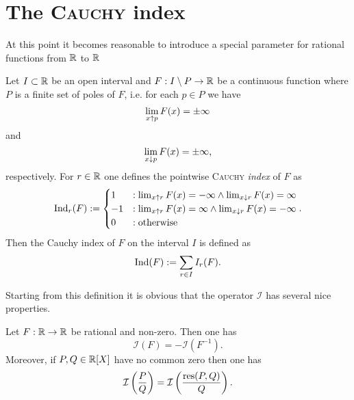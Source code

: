 \section{The \textsc{Cauchy} index}

At this point it becomes reasonable to introduce a special parameter for rational functions from $\mathbb{R}$ to $\mathbb{R}$

\begin{definition} Let $I\subset\mathbb{R}$ be an open interval and $F:I\setminus P\rightarrow \mathbb{R}$ be a continuous function where $P$ is a finite set of poles of $F$, i.e. for each $p\in P$ we have 
\begin{equation}
\lim_{x\uparrow p}{F(x)}=\pm\infty
\end{equation}
and 
\begin{equation}
\lim_{x\downarrow p}{F(x)}=\pm\infty\text{,}
\end{equation}
respectively. For $r\in\mathbb{R}$ one defines the pointwise \textsc{Cauchy} \emph{index} of $F$ as
\begin{equation}
\operatorname{Ind}_r(F):=\begin{cases}
1 &: \lim_{x\uparrow r}{F(x)}=-\infty\wedge \lim_{x\downarrow r}{F(x)}=\infty\\
-1 &: \lim_{x\uparrow r}{F(x)}=\infty\wedge \lim_{x\downarrow r}{F(x)}=-\infty\\
0 &: \text{otherwise}
\end{cases}\text{.}
\end{equation}
Then the Cauchy index of $F$ on the interval $I$ is defined as
\begin{equation}
\operatorname{Ind}(F) := \sum_{r\in I}{I_r(F)}\text{.}
\end{equation}
\end{definition}

Starting from this definition it is obvious that the operator $\mathcal{I}$ has several nice properties.

\begin{lemma}
Let $F:\mathbb{R}\rightarrow\mathbb{R}$ be rational and non-zero. Then one has 
\begin{equation}
\mathcal{I}(F)=-\mathcal{I}(F^{-1})\text{.}
\end{equation}
Moreover, if $P,Q\in\mathbb{R}[X]$ have no common zero then one has 
\begin{equation}
\mathcal{I}\left(\frac{P}{Q}\right) = \mathcal{I}\left(\frac{\operatorname{res}(P,Q)}{Q}\right)\text{.}
\end{equation}
\end{lemma}


